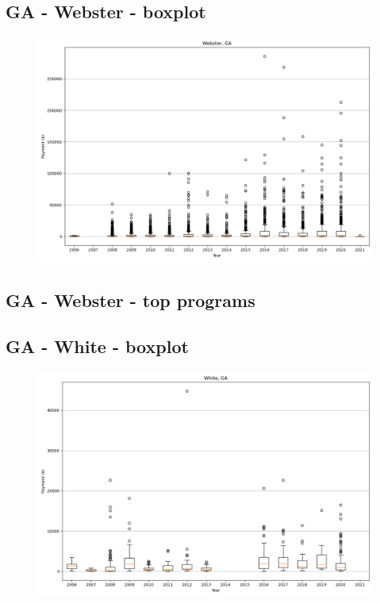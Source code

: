 \subsection*{GA - Webster - boxplot}
\begin{figure}[h]
\centering
\includegraphics[width=7in]{../output/boxplots/counties/Webster-GA_boxplot.png}
\end{figure}


\subsection*{GA - Webster - top programs}

\newpage
\subsection*{GA - White - boxplot}
\begin{figure}[h]
\centering
\includegraphics[width=7in]{../output/boxplots/counties/White-GA_boxplot.png}
\end{figure}


